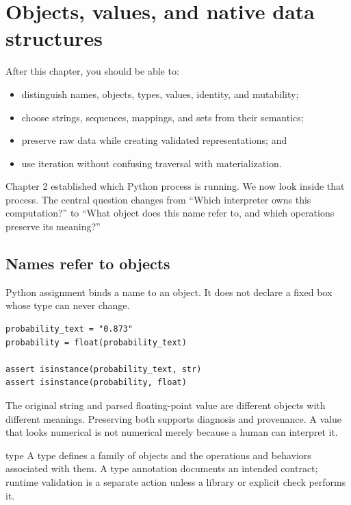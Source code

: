 \chapter{Objects, values, and native data structures}
\label{ch:python-data}

\begin{learningobjectives}
After this chapter, you should be able to:
\begin{itemize}
  \item distinguish names, objects, types, values, identity, and mutability;
  \item choose strings, sequences, mappings, and sets from their semantics;
  \item preserve raw data while creating validated representations; and
  \item use iteration without confusing traversal with materialization.
\end{itemize}
\end{learningobjectives}

\begin{chapterconnection}
Chapter 2 established which Python process is running. We now look inside that
process. The central question changes from ``Which interpreter owns this
computation?'' to ``What object does this name refer to, and which operations
preserve its meaning?''
\end{chapterconnection}

\section{Names refer to objects}

Python assignment binds a name to an object. It does not declare a fixed box
whose type can never change.

\begin{lstlisting}
probability_text = "0.873"
probability = float(probability_text)

assert isinstance(probability_text, str)
assert isinstance(probability, float)
\end{lstlisting}

The original string and parsed floating-point value are different objects with
different meanings. Preserving both supports diagnosis and provenance. A value
that looks numerical is not numerical merely because a human can interpret it.

\begin{definitionbox}{type}
A type defines a family of objects and the operations and behaviors associated
with them. A type annotation documents an intended contract; runtime validation
is a separate action unless a library or explicit check performs it.
\end{definitionbox}

